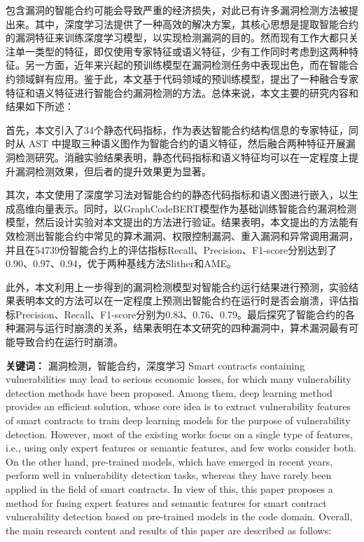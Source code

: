 \cleardoublepage
{}
包含漏洞的智能合约可能会导致严重的经济损失，对此已有许多漏洞检测方法被提出来。其中，深度学习法提供了一种高效的解决方案，其核心思想是提取智能合约的漏洞特征来训练深度学习模型，以实现检测漏洞的目的。然而现有工作大都只关注单一类型的特征，即仅使用专家特征或语义特征，少有工作同时考虑到这两种特征。另一方面，近年来兴起的预训练模型在漏洞检测任务中表现出色，而在智能合约领域鲜有应用。鉴于此，本文基于代码领域的预训练模型，提出了一种融合专家特征和语义特征进行智能合约漏洞检测的方法。总体来说，本文主要的研究内容和结果如下所述：

首先，本文引入了34个静态代码指标，作为表达智能合约结构信息的专家特征，同时从 AST 中提取三种语义图作为智能合约的语义特征，然后融合两种特征开展漏洞检测研究。消融实验结果表明，静态代码指标和语义特征均可以在一定程度上提升漏洞检测效果，但后者的提升效果更为显著。

其次，本文使用了深度学习法对智能合约的静态代码指标和语义图进行嵌入，以生成高维向量表示。同时，以GraphCodeBERT模型作为基础训练智能合约漏洞检测模型，然后设计实验对本文提出的方法进行验证。结果表明，本文提出的方法能有效检测出智能合约中常见的算术漏洞、权限控制漏洞、重入漏洞和异常调用漏洞，并且在\num{54739}份智能合约上的评估指标Recall、Precision、F1-score分别达到了0.90、0.97、0.94，优于两种基线方法Slither和AME。
    
此外，本文利用上一步得到的漏洞检测模型对智能合约运行结果进行预测，实验结果表明本文的方法可以在一定程度上预测出智能合约在运行时是否会崩溃，评估指标Precision、Recall、F1-score分别为0.83、0.76、0.79。最后探究了智能合约的各种漏洞与运行时崩溃的关系，结果表明在本文研究的四种漏洞中，算术漏洞最有可能导致合约在运行时崩溃。


\hspace*{\fill}

\noindent \textbf{关键词：} 漏洞检测，智能合约，深度学习
\cleardoublepage
{}
Smart contracts containing vulnerabilities may lead to serious economic losses, for which many vulnerability detection methods have been proposed. Among them, deep learning method provides an efficient solution, whose core idea is to extract vulnerability features of smart contracts to train deep learning models for the purpose of vulnerability detection. However, most of the existing works focus on a single type of features, i.e., using only expert features or semantic features, and few works consider both. On the other hand, pre-trained models, which have emerged in recent years, perform well in vulnerability detection tasks, whereas they have rarely been applied in the field of smart contracts. In view of this, this paper proposes a method for fusing expert features and semantic features for smart contract vulnerability detection based on pre-trained models in the code domain. Overall, the main research content and results of this paper are described as follows:

